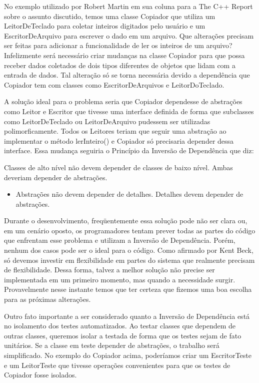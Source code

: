 No exemplo utilizado por Robert Martin em sua coluna para a The C++ Report sobre o assunto discutido, temos uma classe Copiador que utiliza um LeitorDeTeclado para coletar inteiros digitados pelo usuário e um EscritorDeArquivo para escrever o dado em um arquivo. Que alterações precisam ser feitas  para adicionar a funcionalidade de ler os inteiros de um arquivo? Infelizmente será necessário criar mudanças na classe Copiador para que possa receber dados coletados de dois tipos diferentes de objetos que lidam com a entrada de dados. Tal alteração só se torna necessária devido a dependência que Copiador tem com classes como EscritorDeArquivos e LeitorDoTeclado.
	
A solução ideal para o problema seria que Copiador dependesse de abstrações como Leitor e Escritor que tivesse uma interface definida de forma que subclasses como LeitorDeTeclado ou LeitorDeArquivo pudessem ser utilizadas polimorficamente. Todos os Leitores teriam que seguir uma abstração ao implementar o método lerInteiro() e Copiador só precisaria depender dessa interface. Essa mudança seguiria o Princípio da Inversão de Dependência que diz:
	
Classes de alto nível não devem depender de classes de baixo nível. Ambas deveriam depender de abstrações.

\begin{itemize}
	\item Abstrações não devem depender de detalhes. Detalhes devem depender de abstrações.
\end{itemize}

Durante o desenvolvimento, freqüentemente essa solução pode não ser clara ou, em um cenário oposto, os programadores tentam prever todas as partes do código que enfrentam esse problema e utilizam a Inversão de Dependência. Porém, nenhum dos casos pode ser o ideal para o código. Como afirmado por Kent Beck, só devemos investir em flexibilidade em partes do sistema que realmente precisam de flexibilidade. Dessa forma, talvez a melhor solução não precise ser implementada em um primeiro momento, mas quando a necessidade surgir. Provavelmente nesse instante temos que ter certeza que fizemos uma boa escolha para as próximas alterações.
	
Outro fato importante a ser considerado quanto a Inversão de Dependência está no isolamento dos testes automatizados. Ao testar classes que dependem de outras classes, queremos isolar a testada de forma que os testes sejam de fato unitários. Se a classe em teste depender de abstrações, o trabalho será simplificado. No exemplo do Copiador acima, poderíamos criar um EscritorTeste e um LeitorTeste que tivesse operações convenientes para que os testes de Copiador fosse isolados.

